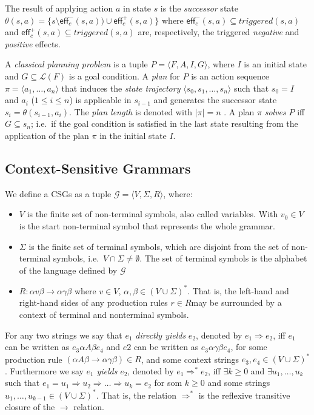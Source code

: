 \documentclass[letterpaper]{article} %
\newcommand{\tup}[1]{{\langle #1 \rangle}}
\newcommand{\eff}{\mathsf{eff}}     %
\begin{document}
The result of applying action $a$ in state $s$ is the {\em successor} state $\theta(s,a)=\{s\setminus\eff_c^-(s,a))\cup\eff_c^+(s,a)\}$ where $\eff_c^-(s,a)\subseteq triggered(s,a)$ and $\eff_c^+(s,a)\subseteq triggered(s,a)$ are, respectively, the triggered {\em negative} and {\em positive} effects.

A {\em classical planning problem} is a tuple $P=\tup{F,A,I,G}$, where $I$ is an initial state and $G\subseteq\mathcal{L}(F)$ is a goal condition. A {\em plan} for $P$ is an action sequence $\pi=\tup{a_1, \ldots, a_n}$ that induces the {\em state trajectory} $\tup{s_0, s_1, \ldots, s_n}$ such that $s_0=I$ and $a_i$ ({\small $1\leq i\leq n$}) is applicable in $s_{i-1}$ and generates the successor state $s_i=\theta(s_{i-1},a_i)$. The {\em plan length} is denoted with $|\pi|=n$ . A plan $\pi$ {\em solves} $P$ iff $G\subseteq s_n$; i.e.~if the goal condition is satisfied in the last state resulting from the application of the plan $\pi$ in the initial state $I$.

\subsection{Context-Sensitive Grammars}
We define a CSGs as a tuple $\mathcal{G}=\tup{V,\Sigma,R}$, where:
\begin{itemize}
\item $V$ is the finite set of non-terminal symbols, also called variables. With $v_0\in V$ is the start non-terminal symbol that represents the whole grammar.
\item $\Sigma$ is the finite set of terminal symbols, which are disjoint from the set of non-terminal symbols, i.e.~$V\cap \Sigma\neq\emptyset$. The set of terminal symbols is the alphabet of the language defined by $\mathcal{G}$
\item $R:\alpha v\beta\rightarrow \alpha\gamma\beta$ where $v\in V$, $\alpha,\beta\in(V\cup\Sigma)^*$. That is, the left-hand and right-hand sides of any production rules $r\in R $may be surrounded by a context of terminal and nonterminal symbols.
\end{itemize}

For any two strings  we say that $e_1$ {\it directly yields} $e_2$, denoted by $e_1\Rightarrow e_2$, iff $e_1$ can be written as $e_3\alpha A\beta e_4$ and $e2$ can be written as $e_3\alpha \gamma\beta e_4$, for some production rule $(\alpha A\beta\rightarrow\alpha\gamma\beta)\in R$, and some context strings $e_3,e_4\in (V\cup \Sigma)^*$. Furthermore we say $e_1$ {\it yields} $e_2$, denoted by $e_1\Rightarrow^* e_2$, iff $\exists k\geq 0$ and $\exists u_1, \ldots, u_k$ such that $e_1=u_1\Rightarrow u_2\Rightarrow \ldots \Rightarrow u_k=e_2$ for som $k\geq 0$ and some strings $u_1,\ldots,u_{k-1}\in(V\cup\Sigma)^*$. That is, the relation $\Rightarrow^*$ is the reflexive transitive closure of the $\rightarrow$ relation.
\end{document}

